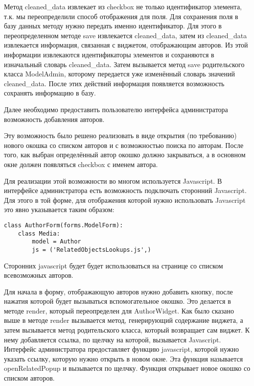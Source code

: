 Метод cleaned\_data извлекает из checkbox не только идентификатор элемента, т.к. мы переопределили способ отображения для поля. Для сохранения поля в базу данных методу нужно передать именно идентификатор. Для этого в переопределенном методе save извлекается cleaned\_data, затем из cleaned\_data извлекается информация, связанная с виджетом, отображающим авторов. Из этой информации извлекаются идентификаторы элементов и сохраняются в изначальный словарь cleaned\_data. Затем вызывается метод save родительского класса ModelAdmin, которому передается уже изменённый словарь значений cleaned\_data. После этих действий информация появляется возможность сохранять информацию в базу.

Далее необходимо предоставить пользователю интерфейса администратора возможность добавления авторов. 

Эту возможность было решено реализовать в виде открытия (по требованию) нового окошка со списком авторов и с возможностью поиска по авторам. После того, как выбран определённый автор окошко должно закрываться, а в основном окне должен появляться checkbox с именем автора. 

Для реализации этой возможности во многом используется Javascript. В интерфейсе администратора есть возможность подключать сторонний Javascript. Для этого в той форме, для отображения которой нужно использовать Javascript это явно указывается таким образом:

{
\small \begin{verbatim}
class AuthorForm(forms.ModelForm):
    class Media:
    	model = Author
        js = ('RelatedObjectsLookups.js',)

\end{verbatim}
}

Сторонних javascript будет будет использоваться на странице со списком всевозможных авторов.

Для начала в форму, отображающую авторов нужно добавить кнопку, после нажатия которой будет вызываться вспомогательное окошко. Это делается в методе render, который переопределен для AuthorWidget. Как было сказано выше в методе render вызывается метод, генерирующий содержание виджета, а затем вызывается метод родительского класса, который возвращает сам виджет. К нему добавляется ссылка, по щелчку на которой, вызывается Javascript. Интерфейс администратора предоставляет функцию javascript, которой нужно указать ссылку, которую нужно открыть в новом окне. Эта функция называется openRelatedPopup и вызывается по щелчку. Функция открывает новое окошко со списком авторов.

